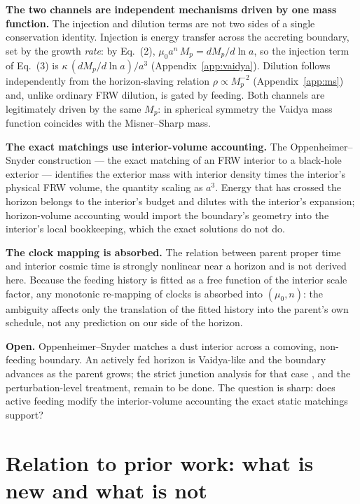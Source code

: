 \documentclass[11pt,a4paper]{article}
\begin{document}
\textbf{The two channels are independent mechanisms driven by one mass function.} The injection and dilution terms are not two sides of a single conservation identity. Injection is energy transfer across the accreting boundary, set by the growth \emph{rate}: by Eq.~(2), $\mu_0 a^n\,M_p = dM_p/d\ln a$, so the injection term of Eq.~(3) is $\kappa\,(dM_p/d\ln a)/a^3$ (Appendix~\ref{app:vaidya}). Dilution follows independently from the horizon-slaving relation $\rho\propto M_p^{-2}$ (Appendix~\ref{app:ms}) and, unlike ordinary FRW dilution, is gated by feeding. Both channels are legitimately driven by the same $M_p$: in spherical symmetry the Vaidya mass function coincides with the Misner--Sharp mass.

\textbf{The exact matchings use interior-volume accounting.} The Oppenheimer--Snyder construction \citep{OppenheimerSnyder1939} --- the exact matching of an FRW interior to a black-hole exterior --- identifies the exterior mass with interior density times the interior's physical FRW volume, the quantity scaling as $a^3$. Energy that has crossed the horizon belongs to the interior's budget and dilutes with the interior's expansion; horizon-volume accounting would import the boundary's geometry into the interior's local bookkeeping, which the exact solutions do not do.

\textbf{The clock mapping is absorbed.} The relation between parent proper time and interior cosmic time is strongly nonlinear near a horizon and is not derived here. Because the feeding history is fitted as a free function of the interior scale factor, any monotonic re-mapping of clocks is absorbed into $(\mu_0,n)$: the ambiguity affects only the translation of the fitted history into the parent's own schedule, not any prediction on our side of the horizon.

\textbf{Open.} Oppenheimer--Snyder matches a dust interior across a comoving, non-feeding boundary. An actively fed horizon is Vaidya-like \citep{Vaidya1951} and the boundary advances as the parent grows; the strict junction analysis for that case \citep{Israel1966,BarrabesIsrael1991}, and the perturbation-level treatment, remain to be done. The question is sharp: does active feeding modify the interior-volume accounting the exact static matchings support?

\section{Relation to prior work: what is new and what is not}\label{sec:prior}
\end{document}
